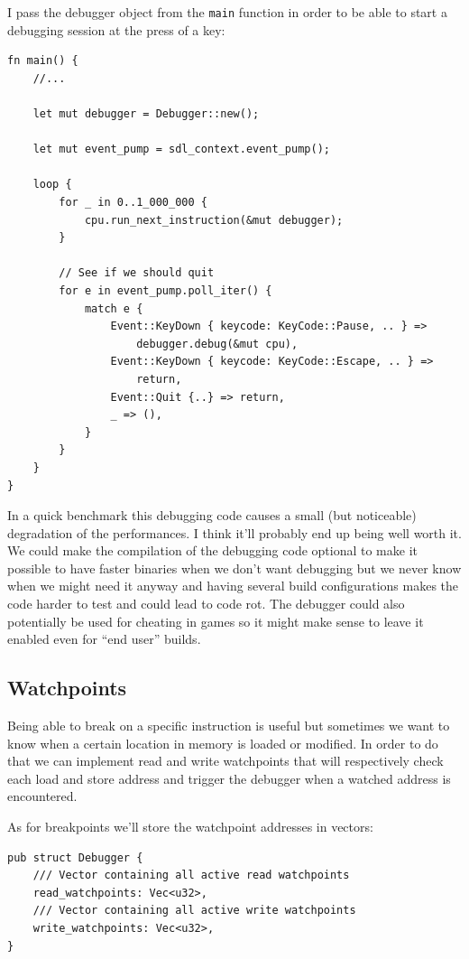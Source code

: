 \documentclass[a4paper]{article}
\newcommand{\code}[1] {\texttt{#1}}
\begin{document}
I pass the debugger object from the \code{main} function in order to
be able to start a debugging session at the press of a key:

\begin{lstlisting}
fn main() {
    //...

    let mut debugger = Debugger::new();

    let mut event_pump = sdl_context.event_pump();

    loop {
        for _ in 0..1_000_000 {
            cpu.run_next_instruction(&mut debugger);
        }

        // See if we should quit
        for e in event_pump.poll_iter() {
            match e {
                Event::KeyDown { keycode: KeyCode::Pause, .. } =>
                    debugger.debug(&mut cpu),
                Event::KeyDown { keycode: KeyCode::Escape, .. } =>
                    return,
                Event::Quit {..} => return,
                _ => (),
            }
        }
    }
}
\end{lstlisting}

In a quick benchmark this debugging code causes a small (but
noticeable) degradation of the performances. I think it'll probably
end up being well worth it. We could make the compilation of the
debugging code optional to make it possible to have faster binaries
when we don't want debugging but we never know when we might need it
anyway and having several build configurations makes the code harder
to test and could lead to code rot. The debugger could also
potentially be used for cheating in games so it might make sense to
leave it enabled even for ``end user'' builds.

\subsection{Watchpoints}

Being able to break on a specific instruction is useful but sometimes
we want to know when a certain location in memory is loaded or
modified. In order to do that we can implement read and write
watchpoints that will respectively check each load and store address
and trigger the debugger when a watched address is encountered.

As for breakpoints we'll store the watchpoint addresses in vectors:

\begin{lstlisting}
pub struct Debugger {
    /// Vector containing all active read watchpoints
    read_watchpoints: Vec<u32>,
    /// Vector containing all active write watchpoints
    write_watchpoints: Vec<u32>,
}
\end{lstlisting}
\end{document}
